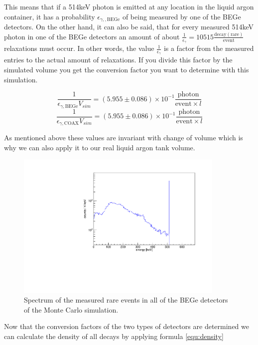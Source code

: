\documentclass[encoding=utf8,british]{tumphthesis}
\begin{document}
This means that if a 514keV photon is emitted at any location in the liquid argon container, it has a probability \(\epsilon_{\gamma,\mathrm{,BEGe}}\) of being measured by one of the BEGe detectors.
On the other hand, it can also be said, that for every measured 514keV photon in one of the BEGe detectors an amount of about $\frac{1}{\epsilon_\gamma} = 10515 \frac{\mathrm{decay(rare)}}{\mathrm{event}}$  relaxations must occur.
In other words, the value $\frac{1}{\epsilon_\gamma}$ is a factor from the measured entries to the actual amount of  relaxations.
If you divide this factor by the simulated volume you get the conversion factor you want to determine with this simulation.

\begin{equation*}
\frac{1}{\epsilon_{\gamma\mathrm{,BEGe}} V_{sim}} = (5.955\pm0.086) \times 10^{-1} \frac{\mathrm{photon}}{\mathrm{event} \times l}
\end{equation*}
\begin{equation*}
\frac{1}{\epsilon_{\gamma\mathrm{,COAX}} V_{sim}} = (5.955\pm0.086) \times 10^{-1} \frac{\mathrm{photon}}{\mathrm{event} \times l}
\end{equation*}

As mentioned above these values are invariant with change of volume which is why we can also apply it to our real liquid argon tank volume. 
\\

\begin{figure}[t!]
	\centering
	\ifmakefigures%
	\includegraphics[width=100mm]{./Bilder/MC-514-Phasenraum.pdf}
	\fi%
	\caption{
    Spectrum of the measured rare \Kr events in all of the BEGe detectors of the Monte Carlo simulation.
	}
	\label{fig:PhasenraumMC514}
\end{figure}

Now that the conversion factors of the two types of detectors are determined we can calculate the density of all \Kr decays by applying formula \ref{equ:density}
\end{document}
